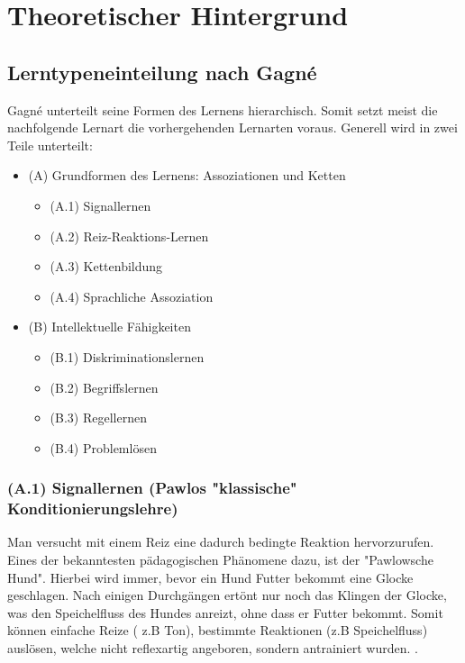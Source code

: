 \chapter{Theoretischer Hintergrund}

\section{Lerntypeneinteilung nach Gagné}

Gagné unterteilt seine Formen des Lernens hierarchisch. Somit setzt meist die nachfolgende Lernart die vorhergehenden Lernarten voraus. Generell wird in zwei Teile unterteilt: 
\begin{itemize}
\item (A) Grundformen des Lernens: Assoziationen und Ketten 
    \begin{itemize}
        \item (A.1) Signallernen
        \item (A.2) Reiz-Reaktions-Lernen
        \item (A.3) Kettenbildung
        \item (A.4) Sprachliche Assoziation
    \end{itemize}
\item (B) Intellektuelle Fähigkeiten
    \begin{itemize}
        \item (B.1) Diskriminationslernen
        \item (B.2) Begriffslernen
        \item (B.3) Regellernen 
        \item (B.4) Problemlösen
    \end{itemize}
\end{itemize}

\subsection[]{(A.1) Signallernen (Pawlos "klassische" Konditionierungslehre)}

Man versucht mit einem Reiz eine dadurch bedingte Reaktion hervorzurufen. Eines der bekanntesten pädagogischen Phänomene dazu, ist der "Pawlowsche Hund". Hierbei wird immer, bevor ein Hund Futter bekommt eine Glocke geschlagen. Nach einigen Durchgängen ertönt nur noch das Klingen der Glocke, was den Speichelfluss des Hundes anreizt, ohne dass er Futter bekommt. Somit können einfache Reize ( z.B Ton), bestimmte Reaktionen (z.B Speichelfluss) auslösen, welche nicht reflexartig angeboren, sondern antrainiert wurden. . %

